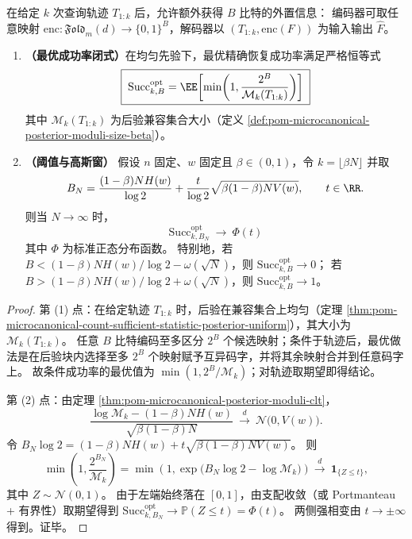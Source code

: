 \begin{theorem}\label{thm:pom-microcanonical-query-plus-bits-phase}
在给定 \(k\) 次查询轨迹 \(T_{1:k}\) 后，允许额外获得 \(B\) 比特的外置信息：
编码器可取任意映射 \(\mathrm{enc}:\mathfrak{Fold}_m(d)\to\{0,1\}^B\)，解码器以 \((T_{1:k},\mathrm{enc}(F))\) 为输入输出 \(\widehat F\)。
\begin{enumerate}
  \item \textbf{（最优成功率闭式）}在均匀先验下，最优精确恢复成功率满足严格恒等式
  \[
  \boxed{\;
  \mathrm{Succ}^{\mathrm{opt}}_{k,B}
  =\EE\!\left[\min\!\left(1,\frac{2^B}{\mathcal{M}_k(T_{1:k})}\right)\right]\;}
  \]
  其中 \(\mathcal{M}_k(T_{1:k})\) 为后验兼容集合大小（定义 \ref{def:pom-microcanonical-posterior-moduli-size-beta}）。
  \item \textbf{（阈值与高斯窗）}
  假设 \(n\) 固定、\(w\) 固定且 \(\beta\in(0,1)\)，令 \(k=\lfloor\beta N\rfloor\) 并取
  \[
  B_N=\frac{(1-\beta)NH(w)}{\log 2}
  +\frac{t}{\log 2}\sqrt{\beta(1-\beta)N V(w)},
  \qquad t\in\RR.
  \]
  则当 \(N\to\infty\) 时，
  \[
  \boxed{\;
  \mathrm{Succ}^{\mathrm{opt}}_{k,B_N}\ \longrightarrow\ \Phi(t)\;}
  \]
  其中 \(\Phi\) 为标准正态分布函数。
  特别地，若 \(B<(1-\beta)NH(w)/\log 2-\omega(\sqrt N)\)，则 \(\mathrm{Succ}^{\mathrm{opt}}_{k,B}\to 0\)；
  若 \(B>(1-\beta)NH(w)/\log 2+\omega(\sqrt N)\)，则 \(\mathrm{Succ}^{\mathrm{opt}}_{k,B}\to 1\)。
\end{enumerate}
\end{theorem}
\begin{proof}
第 (1) 点：在给定轨迹 \(T_{1:k}\) 时，后验在兼容集合上均匀（定理 \ref{thm:pom-microcanonical-count-sufficient-statistic-posterior-uniform}），其大小为 \(\mathcal{M}_k(T_{1:k})\)。
任意 \(B\) 比特编码至多区分 \(2^B\) 个候选映射；条件于轨迹后，最优做法是在后验块内选择至多 \(2^B\) 个映射赋予互异码字，并将其余映射合并到任意码字上。
故条件成功率的最优值为 \(\min(1,2^B/\mathcal{M}_k)\)；对轨迹取期望即得结论。
\par
第 (2) 点：由定理 \ref{thm:pom-microcanonical-posterior-moduli-clt}，
\[
\frac{\log \mathcal{M}_k-(1-\beta)NH(w)}{\sqrt{\beta(1-\beta)N}}
\ \xrightarrow{d}\ \mathcal N\bigl(0,V(w)\bigr).
\]
令 \(B_N\log 2=(1-\beta)NH(w)+t\sqrt{\beta(1-\beta)NV(w)}\)。
则
\[
\min\!\left(1,\frac{2^{B_N}}{\mathcal{M}_k}\right)
=\min\!\left(1,\exp\!\bigl(B_N\log 2-\log\mathcal{M}_k\bigr)\right)
\xrightarrow{d}\ \mathbf{1}_{\{Z\le t\}},
\]
其中 \(Z\sim\mathcal N(0,1)\)。
由于左端始终落在 \([0,1]\)，由支配收敛（或 Portmanteau + 有界性）取期望得到
\(
\mathrm{Succ}^{\mathrm{opt}}_{k,B_N}\to \mathbb{P}(Z\le t)=\Phi(t)
\)。
两侧强相变由 \(t\to\pm\infty\) 得到。证毕。
\end{proof}







\endinput

